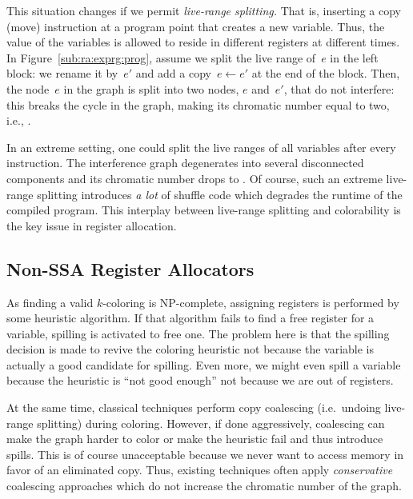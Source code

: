 {This situation changes if we permit \emph{live-range splitting.} That is, 
inserting a copy (move) instruction at a program point that creates a new 
variable. Thus, the value of the variables is allowed to reside in different 
registers at different times.  In Figure~\ref{sub:ra:exprg:prog}, assume we 
split the live range of~$e$ in the left block: we rename it by~$e'$ and add a 
copy~$e \gets e'$ at the end of the block. Then, the node~$e$ in the graph is 
split into two nodes, $e$ and~$e'$, that do not interfere: this breaks the 
cycle in the graph, making its chromatic number equal to two, i.e., \maxlive.


In an extreme setting, one could split the live ranges of all variables after every instruction.
The interference graph degenerates into several disconnected components and its chromatic number drops to \maxlive.
Of course, such an extreme live-range splitting introduces \emph{a lot} of shuffle code which degrades the runtime of the compiled program.
This interplay between live-range splitting and colorability is the key issue in register allocation.

\subsection{Non-SSA Register Allocators}
As finding a valid $k$-coloring is NP-complete, assigning registers is performed by some heuristic algorithm.
If that algorithm fails to find a free register for a variable, spilling is activated to free one.
The problem here is that the spilling decision is made to revive the coloring heuristic not because the variable is actually a good candidate for spilling. 
Even more, we might even spill a variable because the heuristic is ``not good enough'' not because we are out of registers.

At the same time, classical techniques perform copy coalescing (i.e.~undoing live-range splitting) during coloring.
However, if done aggressively, coalescing can make the graph harder to color or make the heuristic fail and thus introduce spills.
This is of course unacceptable because we never want to access memory in favor of an eliminated copy.
Thus, existing techniques often apply \emph{conservative} coalescing approaches which do not increase the chromatic number of the graph.

}
